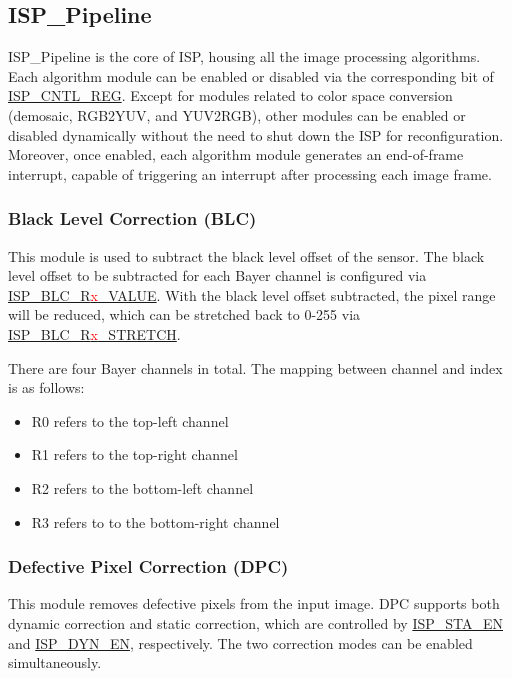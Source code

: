 \documentclass[main\_\_EN.tex]{subfiles}
\begin{document}
\subsection{ISP\_Pipeline}
\label{sec:isp_pipeline}
ISP\_Pipeline is the core of ISP, housing all the image processing algorithms. Each algorithm module can be enabled or disabled via the corresponding bit of \hyperref[regdesc:ISPCNTLREG]{ISP\_CNTL\_REG}. Except for modules related to color space conversion (demosaic, RGB2YUV, and YUV2RGB), other modules can be enabled or disabled dynamically without the need to shut down the ISP for reconfiguration. Moreover, once enabled, each algorithm module generates an end-of-frame interrupt, capable of triggering an interrupt after processing each image frame.


\subsubsection{Black Level Correction (BLC)}
\label{sec:isp_blc}
This module is used to subtract the black level offset of the sensor. The black level offset to be subtracted for each Bayer channel is configured via \hyperref[fielddesc:ISPBLCR0VALUE]{ISP\_BLC\_R\textcolor{red}{x}\_VALUE}. With the black level offset subtracted, the pixel range will be reduced, which can be stretched back to 0-255 via \hyperref[fielddesc:ISPBLCR0STRETCH]{ISP\_BLC\_R\textcolor{red}{x}\_STRETCH}.

There are four Bayer channels in total. The mapping between channel and index is as follows:
\begin{itemize}
\item R0 refers to the top-left channel
\item R1 refers to the top-right channel
\item R2 refers to the bottom-left channel
\item R3 refers to to the bottom-right channel
\end{itemize}


\subsubsection{Defective Pixel Correction (DPC)}
\label{sec:isp_dpc}
This module removes defective pixels from the input image. DPC supports both dynamic correction and static correction, which are controlled by \hyperref[fielddesc:ISPSTAEN]{ISP\_STA\_EN} and \hyperref[fielddesc:ISPDYNEN]{ISP\_DYN\_EN}, respectively. The two correction modes can be enabled simultaneously.
\end{document}
